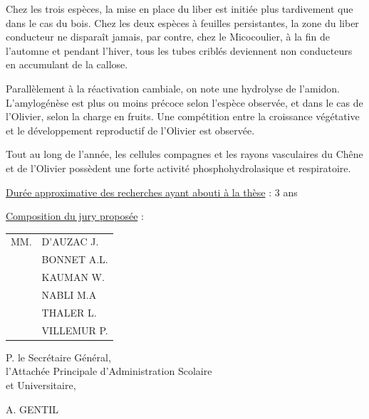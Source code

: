 Chez les trois espèces, la mise en place du liber est initiée plus tardivement que dans le cas du bois. Chez les deux espèces à feuilles persistantes, la zone du liber conducteur ne disparaît jamais, par contre, chez le Micocoulier, à la fin de l'automne et pendant l'hiver, tous les tubes criblés deviennent non conducteurs en accumulant de la callose.

Parallèlement à la réactivation cambiale, on note une hydrolyse de l'amidon. L'amylogénèse est plus ou moins précoce selon l'espèce observée, et dans le cas de l'Olivier, selon la charge en fruits. Une compétition entre la croissance végétative et le développement reproductif de l'Olivier est observée.

Tout au long de l'année, les cellules compagnes et les rayons vasculaires du Chêne et de l'Olivier possèdent une forte activité phosphohydrolasique et respiratoire.

\uline{Durée approximative des recherches ayant abouti à la thèse} : 3 ans

\uline{Composition du jury proposée} :

\begin{tabular}{ll}
MM. & D'AUZAC J.\\
& BONNET A.L.\\
& KAUMAN W.\\
& NABLI M.A\\
& THALER L.\\
& VILLEMUR P.
\end{tabular}

\begin{center}
P. le Secrétaire Général,\\
l'Attachée Principale d'Administration Scolaire\\
et Universitaire,


A. GENTIL
\end{center}


